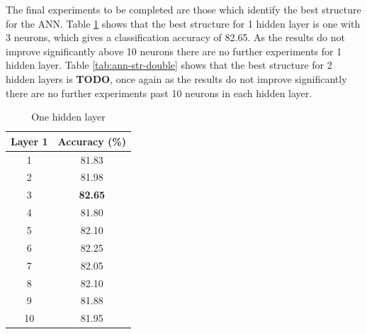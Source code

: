 \documentclass[12pt]{article}
\begin{document}
      The final experiments to be completed are those which identify the best structure for the ANN. Table \ref{tab:ann-str-single} shows that the best structure for 1 hidden layer is one with 3 neurons, which gives a classification accuracy of 82.65. As the results do not improve significantly above 10 neurons there are no further experiments for 1 hidden layer. Table \ref{tab:ann-str-double} shows that the best structure for 2 hidden layers is \textbf{TODO}, once again as the results do not improve significantly there are no further experiments past 10 neurons in each hidden layer.

      \singlespacing
      \begin{table}[H]
        \centering
        \caption{One hidden layer}
        \begin{tabular}{c|c}
          \toprule
          Layer 1 & Accuracy (\%) \\
          \midrule
          1     & 81.83 \\
          2     & 81.98 \\
          3     & \textbf{82.65} \\
          4     & 81.80 \\
          5     & 82.10 \\
          6     & 82.25 \\
          7     & 82.05 \\
          8     & 82.10 \\
          9     & 81.88 \\
          10    & 81.95 \\
          \bottomrule
        \end{tabular}
        \label{tab:ann-str-single}
      \end{table}
\end{document}
